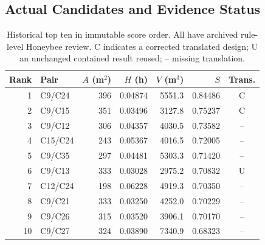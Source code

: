 \documentclass{llncs}
\begin{document}
\subsection{Actual Candidates and Evidence Status}
\begin{table}[tbp]\caption{Historical top ten in immutable score order. All have archived rule-level Honeybee review. C indicates a corrected translated design; U an unchanged contained result reused; -- missing translation.}\label{tab:historical}\centering
\small
\begin{tabular}{rlrrrrc}\toprule
Rank & Pair & $A$ (m$^2$) & $H$ (h) & $V$ (m$^3$) & $S$ & Trans.\\\midrule
1 & C9/C24 & 396 & 0.04874 & 5551.3 & 0.84486 & C\\
2 & C9/C15 & 351 & 0.03496 & 3127.8 & 0.75237 & C\\
3 & C9/C12 & 306 & 0.04357 & 4030.5 & 0.73582 & --\\
4 & C15/C24 & 243 & 0.05367 & 4016.5 & 0.72005 & --\\
5 & C9/C35 & 297 & 0.04481 & 5303.3 & 0.71420 & --\\
6 & C9/C13 & 333 & 0.03028 & 2975.2 & 0.70832 & U\\
7 & C12/C24 & 198 & 0.06228 & 4919.3 & 0.70350 & --\\
8 & C9/C21 & 333 & 0.03250 & 4252.0 & 0.70229 & --\\
9 & C9/C26 & 315 & 0.03520 & 3906.1 & 0.70170 & --\\
10 & C9/C27 & 324 & 0.03890 & 7340.9 & 0.68323 & --\\
\bottomrule\end{tabular}

\end{table}
\end{document}
